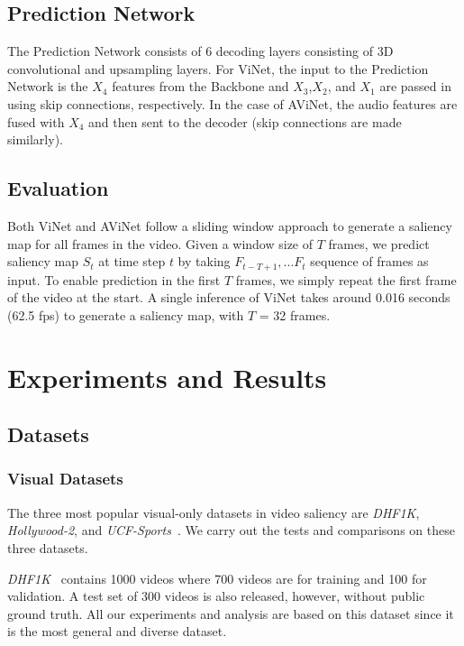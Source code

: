 \documentclass[letterpaper, 10 pt, conference]{ieeeconf}  \usepackage{times}
\begin{document}
\begin{table*}[t]
    \label{table:test_results}
\end{table*}





\subsection{Prediction Network}


The Prediction Network consists of 6 decoding layers consisting of 3D convolutional and upsampling layers. For ViNet, the input to the Prediction Network is the $X_4$ features from the Backbone and $X_3$,$X_2$, and $X_1$ are passed in using skip connections, respectively. In the case of AViNet, the audio features are fused with $X_4$ and then sent to the decoder (skip connections are made similarly). 




\subsection{Evaluation}
Both ViNet and AViNet follow a sliding window approach to generate a saliency map for all frames in the video. Given a window size of $T$ frames, we predict saliency map $S_{t}$ at time step $t$ by taking $F_{t-T+1},...F_{t}$ sequence of frames as input. To enable prediction in the first $T$ frames, we simply repeat the first frame of the video at the start. A single inference of ViNet takes around 0.016 seconds (62.5 fps) to generate a saliency map, with $T$ = 32 frames.






\section{Experiments and Results}
\subsection{Datasets}
\subsubsection{Visual Datasets}
The three most popular visual-only datasets in video saliency are \emph{DHF1K}, \emph{Hollywood-2}, and \emph{UCF-Sports}~\cite{rodriguez2008action}. We carry out the tests and comparisons on these three datasets. 

\emph{DHF1K}~\cite{wang2018revisiting} contains 1000 videos where 700 videos are for training and 100 for validation. A test set of 300 videos is also released, however, without public ground truth. All our experiments and analysis are based on this dataset since it is the most general and diverse dataset.
\end{document}
